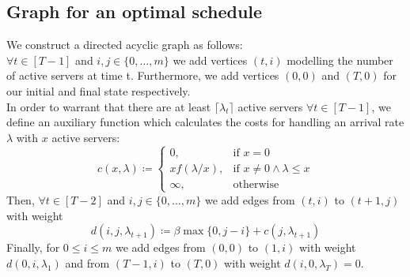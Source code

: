 \documentclass[hidelinks]{article}
\theoremstyle{plain}
\theoremstyle{definition}
\theoremstyle{rem}
\newcommand{\fromto}[2]{\{#1,\ldots,#2\}}
\begin{document}
\begin{sloppypar}
\subsection{Graph for an optimal schedule}\label{sec:optgraph}
We construct a directed acyclic graph as follows:\\
$\forall t\in[T-1]$ and $i,j\in\fromto{0}{m}$ we add vertices $(t,i)$ modelling the number of active servers at time t. Furthermore, we add vertices $(0,0)$ and $(T,0)$ for our initial and final state respectively.\\
In order to warrant that there are at least $\lceil\lambda_t\rceil$ active servers $\forall t\in[T-1]$, we define an auxiliary function which calculates the costs for handling an arrival rate $\lambda$ with $x$ active servers:
\begin{equation}
	c(x,\lambda)\coloneqq\begin{cases}
          0, & \text{if $x=0$}\\
	  xf(\lambda/x), & \text{if $x\ne 0\wedge\lambda\le x$}\\
	  \infty, & \text{otherwise}
	  \end{cases} \label{fct:c}
\end{equation}
Then, $\forall t\in[T-2]$ and $i,j\in\fromto{0}{m}$ we add edges from $(t,i)$ to $(t+1,j)$ with weight
\begin{equation}
	d(i,j,\lambda_{t+1})\coloneqq\beta\max\{0,j-i\}+c(j,\lambda_{t+1})
\end{equation}
Finally, for $0\le i\le m$ we add edges from $(0,0)$ to $(1,i)$ with weight $d(0,i,\lambda_1)$ and from $(T-1,i)$ to $(T,0)$ with weight $d(i,0,\lambda_T)=0$.
\begin{figure}[H]
\centering
{}
\end{figure}
\end{sloppypar}
\end{document}
